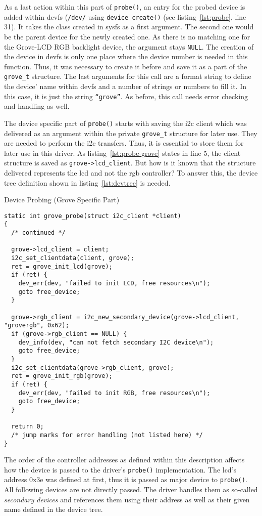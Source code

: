 As a last action within this part of \texttt{probe()}, an entry for the probed device is added within devfs (\texttt{/dev/} using \texttt{device_create()} (see listing~\ref{lst:probe}, line 31).
It takes the class created in sysfs as a first argument.
The second one would be the parent device for the newly created one. 
As there is no matching one for the Grove-LCD RGB backlight device, the argument stays \texttt{NULL}.
The creation of the device in devfs is only one place where the device number is needed in this function.
Thus, it was necessary to create it before and save it as a part of the \texttt{grove\_t} structure.
The last arguments for this call are a format string to define the device' name within devfs and a number of strings or numbers to fill it.
In this case, it is just the string \texttt{``grove''}.
As before, this call needs error checking and handling as well.

The device specific part of \texttt{probe()} starts with saving the \ac{i2c} client which was delivered as an argument within the private \texttt{grove\_t} structure for later use.
They are needed to perform the \ac{i2c} transfers.
Thus, it is essential to store them for later use in this driver.
As listing~\ref{lst:probe-grove} states in line 5, the client structure is saved as \texttt{grove->lcd_client}.
But how is it known that the structure delivered represents the \ac{lcd} and not the \ac{rgb} controller?
To answer this, the device tree definition shown in listing~\ref{lst:devtree} is needed.
%
\begin{listing} [ht]
    \caption{Device Probing (Grove Specific Part)}
    \label{lst:probe-grove}
    \begin{verbatim}
static int grove_probe(struct i2c_client *client)
{
  /* continued */  
  
  grove->lcd_client = client;
  i2c_set_clientdata(client, grove);
  ret = grove_init_lcd(grove);
  if (ret) {
	dev_err(dev, "failed to init LCD, free resources\n");
	goto free_device;
  }

  grove->rgb_client = i2c_new_secondary_device(grove->lcd_client, "grovergb", 0x62);
  if (grove->rgb_client == NULL) {
	dev_info(dev, "can not fetch secondary I2C device\n");
	goto free_device;
  }
  i2c_set_clientdata(grove->rgb_client, grove);
  ret = grove_init_rgb(grove);
  if (ret) {
    dev_err(dev, "failed to init RGB, free resources\n");
    goto free_device;
  }

  return 0;
  /* jump marks for error handling (not listed here) */
}
    \end{verbatim}
\end{listing}
%
The order of the controller addresses as defined within this description affects how the device is passed to the driver's \texttt{probe()} implementation.
The \ac{lcd}'s address 0x3e was defined at first, thus it is passed as major device to \texttt{probe()}.
All following devices are not directly passed.
The driver handles them as so-called \textit{secondary devices} and references them using their address as well as their given name defined in the device tree.

